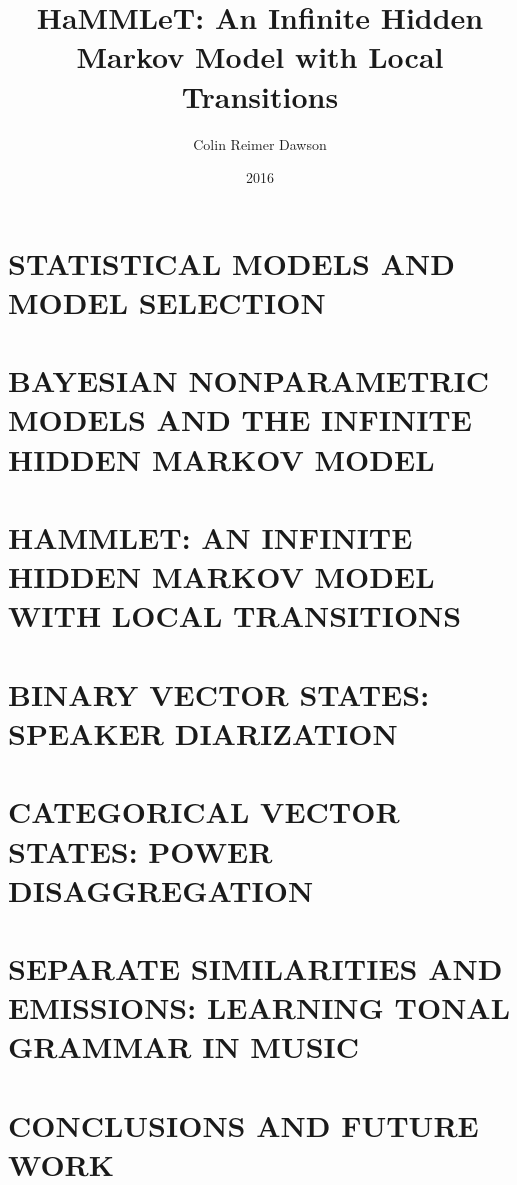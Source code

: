 \documentclass[final]{ua-thesis}
\title{{HaMMLeT}: An Infinite Hidden Markov Model with Local
  Transitions}
\author{Colin Reimer Dawson}
\date{2016}
\begin{document}
% 
\maketitle



% 

% 

\tableofcontents
\listoftables
\listoffigures
\begin{abstract}

\end{abstract}

\chapter{ \MakeUppercase{Statistical Models and Model Selection} }
\label{chapter:intro}



\chapter{ \MakeUppercase{Bayesian Nonparametric Models and the Infinite
  Hidden Markov Model} }
\label{chapter:HMM-NPBayes}


\chapter{\MakeUppercase{HaMMLeT: An infinite Hidden Markov Model with
    Local Transitions}}
\label{chapter:HaMMLeT}


\chapter{\MakeUppercase{Binary Vector States: Speaker Diarization}}
\label{chapter:cocktail-party}


\chapter{\MakeUppercase{Categorical Vector States: Power Disaggregation}}
\label{chapter:REDD}


\chapter{\MakeUppercase{Separate Similarities and Emissions: Learning
  Tonal Grammar in Music}}
\label{chapter:music}


\chapter{\MakeUppercase{Conclusions and Future Work}}
\label{chapter:discussion}




\end{document}
